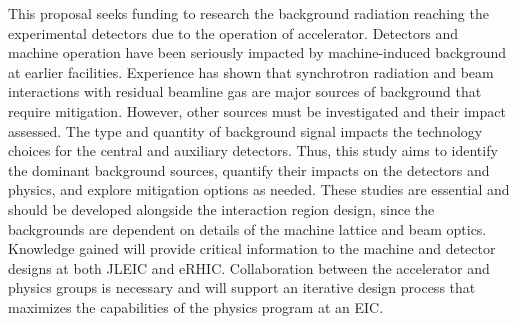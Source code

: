 This proposal seeks funding to research the background radiation reaching the experimental detectors due to the operation of accelerator.  Detectors and machine operation have been seriously impacted by machine-induced background at earlier facilities.  Experience has shown that synchrotron radiation and beam interactions with residual beamline gas are major sources of background that require mitigation.  However, other sources must be investigated and their impact assessed.  The type and quantity of background signal impacts the technology choices for the central and auxiliary detectors.  Thus, this study aims to identify the dominant background sources, quantify their impacts on the detectors and physics, and explore mitigation options as needed.  These studies are essential and should be developed alongside the interaction region design, since the backgrounds are dependent on details of the machine lattice and beam optics.  Knowledge gained will provide critical information to the machine and detector designs at both JLEIC and eRHIC.  Collaboration between the accelerator and physics groups is necessary and will support an iterative design process that maximizes the capabilities of the physics program at an EIC.

